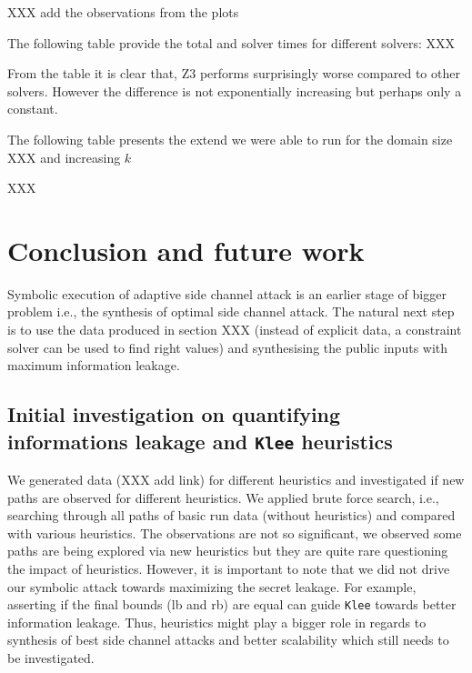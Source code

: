 \documentclass[11pt,a4paper,notitlepage]{article}
\begin{document}
XXX add the observations from the plots

The following table provide the total and solver times for different solvers:
XXX

From the table it is clear that, Z3 performs surprisingly worse compared to other solvers.
However the difference is not exponentially increasing but perhaps only a constant.

The following table presents the extend we were able to run for the domain size XXX and increasing $k$

XXX


\section{Conclusion and future work}
\label{sec:futurework}

Symbolic execution of adaptive side channel attack is an earlier stage of bigger problem i.e., the synthesis of optimal side channel attack.
The natural next step is to use the data produced in section XXX (instead of explicit data, a constraint solver can be used to find right values) and synthesising the public inputs with maximum information leakage.

\subsection{Initial investigation on quantifying informations leakage and \texttt{Klee} heuristics}
\label{subsec:initialinvestigationleakage}

We generated data (XXX add link) for different heuristics and investigated if new paths are observed for different heuristics.
We applied brute force search, i.e., searching through all paths of basic run data (without heuristics) and compared with various heuristics.
The observations are not so significant, we observed some paths are being explored via new heuristics but they are quite rare questioning the impact of heuristics.
However, it is important to note that we did not drive our symbolic attack towards maximizing the secret leakage.
For example, asserting if the final bounds (lb and rb) are equal can guide \texttt{Klee} towards better information leakage.
Thus, heuristics might play a bigger role in regards to synthesis of best side channel attacks and better scalability which still needs to be investigated.





\end{document}
